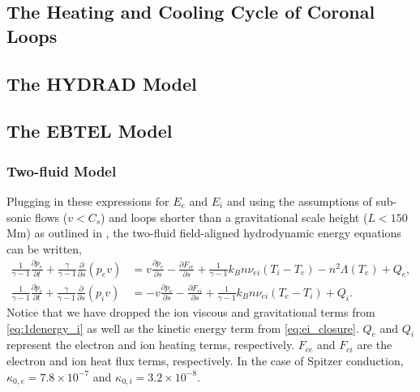 \subsection{The Heating and Cooling Cycle of Coronal Loops}\label{sec:heating-cooling-cycle}

\subsection{The HYDRAD Model}\label{sec:hydrad}


\subsection{The EBTEL Model}\label{sec:ebtel}


\subsubsection{Two-fluid Model}\label{sec:ebtel-two-fluid}


Plugging in these expressions for $E_e$ and $E_i$ and using the assumptions of sub-sonic flows ($v<C_s$) and loops shorter than a gravitational scale height ($L<150$ Mm) as outlined in \citet{klimchuk_highly_2008}, the two-fluid field-aligned hydrodynamic energy equations can be written,
\begin{align}
    \frac{1}{\gamma - 1}\frac{\partial p_e}{\partial t} + \frac{\gamma}{\gamma - 1}\frac{\partial}{\partial s}(p_ev) &= v\frac{\partial p_e}{\partial s} - \frac{\partial F_{ce}}{\partial s} + \frac{1}{\gamma - 1}k_Bn\nu_{ei}(T_i-T_e) -n^2\Lambda(T_e)+Q_{e}, \label{eq:1denergy_e_simp} \\[0.5em]
    \frac{1}{\gamma - 1}\frac{\partial p_i}{\partial t} + \frac{\gamma}{\gamma - 1}\frac{\partial }{\partial s}(p_iv)&= -v\frac{\partial p_e}{\partial s} - \frac{\partial F_{ci}}{\partial s} + \frac{1}{\gamma - 1}k_Bn\nu_{ei}(T_e-T_i) + Q_{i}. \label{eq:1denergy_i_simp}
\end{align}
Notice that we have dropped the ion viscous and gravitational terms from  \autoref{eq:1denergy_i} as well as the kinetic energy term from \autoref{eq:ei_closure}. $Q_{e}$ and $Q_{i}$ represent the electron and ion heating terms, respectively. $F_{ce}$ and $F_{ci}$ are the electron and ion heat flux terms, respectively. In the case of Spitzer conduction, $\kappa_{0,e}=7.8\times10^{-7}$ and $\kappa_{0,i}=3.2\times10^{-8}$.


